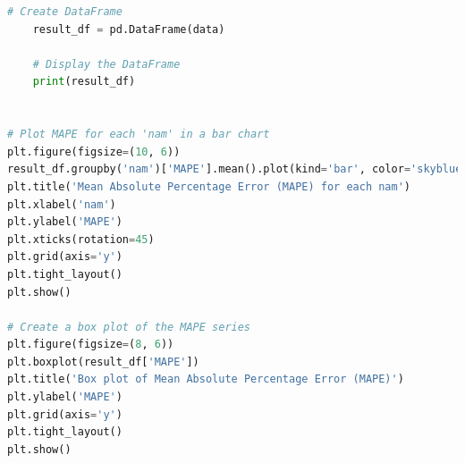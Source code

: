\documentclass{article}
\theoremstyle{mytheoremstyle}
\theoremstyle{mytheoremstyle}
\theoremstyle{myproblemstyle}
\begin{document}
\begin{lstlisting}[language=Python, caption=RegTrees.ipynb,label={lst:LR.ipynb}]
    # Create DataFrame
    result_df = pd.DataFrame(data)
    
    # Display the DataFrame
    print(result_df)
    

# Plot MAPE for each 'nam' in a bar chart
plt.figure(figsize=(10, 6))
result_df.groupby('nam')['MAPE'].mean().plot(kind='bar', color='skyblue')
plt.title('Mean Absolute Percentage Error (MAPE) for each nam')
plt.xlabel('nam')
plt.ylabel('MAPE')
plt.xticks(rotation=45)
plt.grid(axis='y')
plt.tight_layout()
plt.show()

# Create a box plot of the MAPE series
plt.figure(figsize=(8, 6))
plt.boxplot(result_df['MAPE'])
plt.title('Box plot of Mean Absolute Percentage Error (MAPE)')
plt.ylabel('MAPE')
plt.grid(axis='y')
plt.tight_layout()
plt.show()

 \end{lstlisting}
\end{document}
